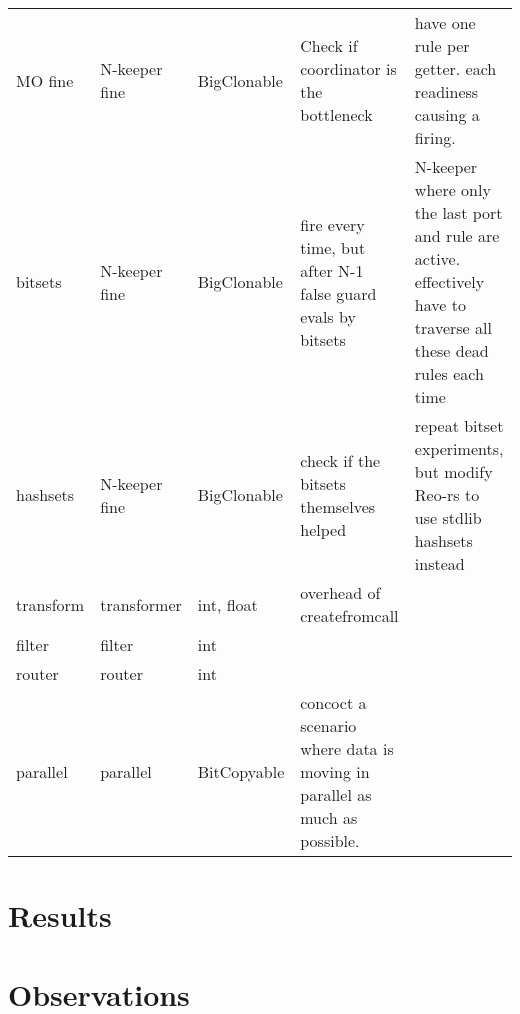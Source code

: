 \begin{landscape}
\begin{table}[p!]
\begin{adjustbox}{width=19cm}
\begin{tabular}{l|ll|p{46mm}p{67mm}}
		MO fine 			  & N-keeper fine  & BigClonable & Check if coordinator is the bottleneck                                   & have one rule per getter. each readiness causing a firing.                                                                                     \\
		bitsets               & N-keeper fine  & BigClonable & fire every time, but after N-1 false guard evals by bitsets              & N-keeper where only the last port and rule are active. effectively have to traverse all these dead rules each time                             \\
		hashsets              & N-keeper fine  & BigClonable & check if the bitsets themselves helped                                   & repeat bitset experiments, but modify Reo-rs to use stdlib hashsets instead                                                                    \\
		transform             & transformer    & int, float  & overhead of createfromcall                                               &                                                                                                                                                \\
		filter                & filter         & int         &                                                                          &                                                                                                                                                \\
		router                & router         & int         &                                                                          &                                                                                                                                                \\
		parallel              & parallel       & BitCopyable & concoct a scenario where data is moving in parallel as much as possible. &                                                                                                                                               
	
\end{tabular}
\end{adjustbox}	
\end{table}
\end{landscape}

\section{Results}
\section{Observations}